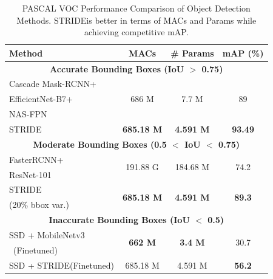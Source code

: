 \documentclass{article}
\newcommand{\name}{STRIDE}
\begin{document}
\begin{table}[htbp]
  \centering
  \caption{ \small PASCAL VOC Performance Comparison of Object Detection Methods. \name is better in terms of MACs and Params while achieving competitive mAP.}
  \begin{adjustbox}{max width=\columnwidth}
    \begin{tabular}{lccc}
      \toprule
      \textbf{Method} & \textbf{MACs} & \textbf{\# Params} & \textbf{mAP (\%)} \\
      \midrule
      \multicolumn{4}{c}{\textbf{Accurate Bounding Boxes (IoU $>$ 0.75)}} \\
      \cmidrule(lr){1-4}
      Cascade Mask-RCNN+  & \multirow{3}{*}{686 M} & \multirow{3}{*}{7.7 M} & \multirow{3}{*}{89} \\
      EfficientNet-B7+& & & \\
      NAS-FPN ~\cite{tan2019efficientnet,ghiasi2021simple}& & & \\
      \name & \textbf{685.18 M} & \textbf{4.591 M} & \textbf{93.49} \\
      \cmidrule(lr){1-4}
      \multicolumn{4}{c}{\textbf{Moderate Bounding Boxes (0.5 $<$ IoU $<$ 0.75)}} \\
      \cmidrule(lr){1-4}
      FasterRCNN+ & \multirow{2}{*}{191.88 G} & \multirow{2}{*}{184.68 M} &\multirow{2}{*}{74.2}\\
      ResNet-101~\cite{ren2015faster,voc_faster_rcnn} & & &\\
      \name & \multirow{2}{*}{\textbf{685.18 M}} & \multirow{2}{*}{\textbf{4.591 M}} & \multirow{2}{*}{\textbf{89.3}} \\
      (20\% bbox var.)& & & \\ 
      \cmidrule(lr){1-4}
      \multicolumn{4}{c}{\textbf{Inaccurate Bounding Boxes (IoU $<$ 0.5)}} \\
      \cmidrule(lr){1-4}
      SSD + MobileNetv3  & \multirow{2}{*}{\textbf{662 M}} & \multirow{2}{*}{\textbf{3.4 M}} & \multirow{2}{*}{30.7} \\
      ~\cite{liu2016ssd,mobilenet}(Finetuned) & & & \\
      SSD + \name (Finetuned) & 685.18 M & 4.591 M & \textbf{56.2} \\
      \bottomrule
    \end{tabular}
  \end{adjustbox}
  \vspace{-10pt}
  \label{tab:pascalVoc_performance_comparison}
\end{table}
\end{document}
